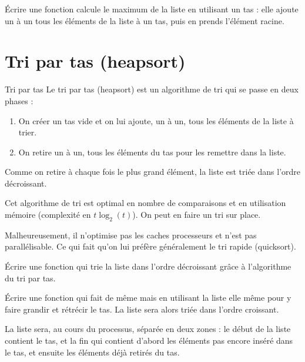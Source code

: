 \documentclass[11pt,a4paper,french,twoside]{PMCours}
\begin{document}
\begin{Exercice}{}
    Écrire une fonction  calcule le maximum de la liste en
    utilisant un tas : elle ajoute un à un tous les éléments de la liste à un tas,
    puis en prends l'élément racine.
\end{Exercice}
    
\section{Tri par tas (heapsort)}

\begin{Methode}{Tri par tas}
Le tri par tas (heapsort) est un algorithme de tri qui se passe en deux phases :
\begin{enumerate}
    \item On créer un tas vide et on lui ajoute, un à un, tous les éléments 
    de la liste à trier.
    \item On retire un à un, tous les éléments du tas pour les remettre dans la
    liste.
\end{enumerate}
Comme on retire à chaque fois le plus grand élément, la liste est triée dans 
l'ordre décroissant. 
\end{Methode}

\begin{Remarque}{}
    Cet algorithme de tri est optimal en nombre de comparaisons et en utilisation 
    mémoire (complexité en $t\log_2(t)$). On peut en faire un tri sur place.

    Malheureusement, il n'optimise pas les caches processeurs et n'est pas 
    parallélisable. Ce qui fait qu'on lui préfère généralement 
    le tri rapide (quicksort).
\end{Remarque}

\begin{Exercice}{}
    Écrire une fonction  qui trie la liste dans l'ordre 
    décroissant grâce à l'algorithme du tri par tas.
\end{Exercice}

\begin{Exercice}[(Optimisation)]
    Écrire une fonction  qui fait de même mais en utilisant
    la liste elle même pour y faire grandir et rétrécir le tas. La liste
    sera alors triée dans l'ordre 
    croissant.

    La liste sera, au cours du processus, séparée en deux zones : 
    le début de la liste contient le tas, et la fin qui contient d'abord les 
    éléments pas encore inséré dans le tas, et ensuite les éléments déjà retirés
    du tas.
\end{Exercice}
\end{document}
